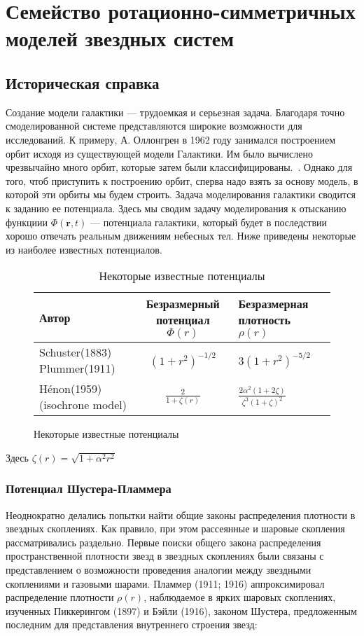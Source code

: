 \section{Семейство ротационно-симметричных моделей звездных систем}

\subsection{Историческая справка}
Создание модели галактики --- трудоемкая и серьезная задача. Благодаря точно смоделированной системе представляются широкие возможности для исследований. К примеру, А. Оллонгрен в 1962 году занимался построением орбит исходя из существующей модели Галактики. Им было вычислено чрезвычайно много орбит, которые затем были классифицированы.~\cite{OLLONGREN}. Однако для того, чтоб приступить к построению орбит, сперва надо взять за основу модель, в которой эти орбиты мы будем строить. Задача моделирования галактики сводится к заданию ее потенциала. Здесь мы сводим задачу моделирования к отысканию функциии $\Phi(\textbf{r}, t)$ --- потенциала галактики, который будет в последствии хорошо отвечать реальным движениям небесных тел. Ниже приведены некоторые из наиболее известных потенциалов.\\
\newpage

\begin{center}
{
\begin{figure}[H]
\begin{table}\caption{Некоторые известные потенциалы}
  \begin{tabular}{| p{4cm}| c | p{4cm} | }  
    \hline
    Автор	&	Безразмерный потенциал $\Phi(r)$	&	Безразмерная плотность $\rho(r)$ \\ \hline
    Schuster(1883) Plummer(1911)		&	{\centering $(1 + r^2)^{-1/2}$ }	&	{\centering$3(1 + r^2)^{-5/2}$} \\ \hline
    H\'{e}non(1959) (isochrone model)	&	$\frac{2}{\displaystyle1 + \zeta(r)}$	&	$\frac{\displaystyle2\alpha^2(1 + 2\zeta)}{\displaystyle\zeta^3(1+\zeta)^2}$ \\
    \hline
  \end{tabular}
 \end{table}
 \end{figure}
}
\end{center}

Здесь $\zeta(r) = \sqrt{1 + \alpha^2r^2}$

\subsubsection{Потенциал Шустера-Пламмера}
Неоднократно делались попытки найти общие законы распределения плотности в звездных скоплениях. Как правило, при этом рассеянные и шаровые скопления рассматривались раздельно. Первые поиски общего закона распределения пространственной плотности звезд в звездных скоплениях были связаны с представлением о возможности проведения аналогии между звездными скоплениями и газовыми шарами. Пламмер (1911; 1916) аппроксимировал распределение плотности $\rho(r)$, наблюдаемое в ярких шаровых скоплениях, изученных Пиккерингом (1897) и Бэйли (1916), законом Шустера, предложенным последним для представления внутреннего строения звезд:

